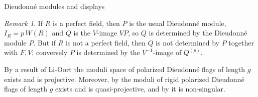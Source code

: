 \documentclass[11pt]{amsart}
\numberwithin{equation}{section}
\theoremstyle{definition}
\theoremstyle{remark}
\newtheorem{remark}[theorem]{Remark}
\begin{document}
\begin{section}{Dieudonn\'e modules and displays}
\begin{remark}
If $R$ is a perfect field, then $P$ is the usual Dieudonn\'e module,
$I_R=p\, W(R)$ and $Q$ is the $V$-image $VP$, so $Q$ is determined by the Dieudonn\'e module $P$.
But if $R$ is not a perfect field, then $Q$ is not determined by $P$ together 
with $F,V$;
conversely $P$ is determined by the $V^{-1}$-image of $Q^{(p)}$.
\end{remark}

By a result of Li-Oort \cite[3.7]{L-O} the moduli space of polarized Dieudonn\'e flags
of length $g$ exists and is projective. Moreover, by \cite[3.7]{L-O} 
the moduli of rigid 
polarized Dieudonn\'e flags of length $g$ exists and is quasi-projective, and
by \cite[7.6]{L-O} it is non-singular.

\end{section}
\end{document}
